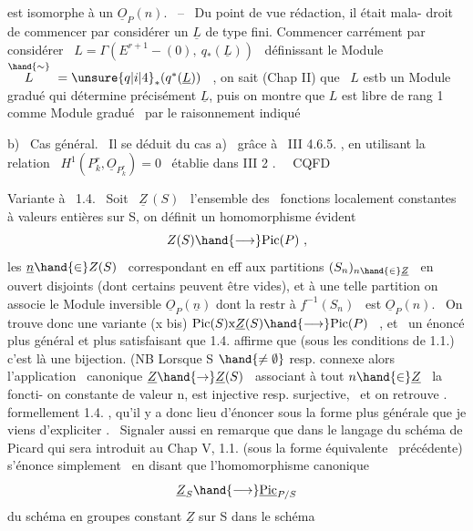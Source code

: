 
\placedmargin{\ensuremath{/}}est isomorphe à un $\underline{O}_P(n)$. \ -- \ Du point de vue rédaction, il était mala-%
droit de commencer par considérer un $\underline{L}$ de type fini. Commencer carrément
par considérer \ $L = \Gamma(E^{r+1}-(0),\ q_*(\underline{L}))$ \ définissant le Module
$\overset{\hand{\sim}}{L} \ = \unsure{q|i|4}_*(q^*(\underline{L}))$ \ , on sait (Chap II) que \ $L$ estb un Module gradué qui
détermine précisément $\underline{L}$, puis on montre que $L$ est libre de rang 1 comme Module
gradué \ par le raisonnement indiqué\placedmargin{\ensuremath{\swarrow}}\unsure{\hand{:}|:}

b) \ Cas général. \ Il se déduit du cas a) \ grâce à \ III 4.6.5. , en
utilisant la relation \ $H^1(P^r_k,\underline{O}_{P^r_k}) = 0$ \ établie dans III 2 . \ \ CQFD\placedmargin{\ensuremath{/}}

Variante à \ 1.4. \ Soit \ $\underline{Z}\,(S)$ \ l'ensemble des \ fonctions localement
constantes à valeurs entières sur S, on définit un homomorphisme évident
\[ Z(S) \hand{\longrightarrow} \mathrm{Pic}(P) \ , \]
les  $\underline{n} \hand{\in} Z(S)$ \ correspondant en eff aux  partitions $(S_n)_{n\hand{\in}\underline{Z}}$ \ en ouvert
disjoints (dont certains peuvent être vides),  et  à une
telle partition on associe le Module inversible $\underline{O}_P(\underline{n})$ dont la restr à 
$f^{-1}(S_n)$ \ est $\underline{O}_P(n)$. \ On trouve donc une variante
(x bis) \hfill $\mathrm{Pic}(S)\mathrm{x}\underline{Z}(S) \hand{\longrightarrow} \mathrm{Pic}(P)$ \ , \hfill
et \ un énoncé plus général et plus satisfaisant que 1.4. affirme que
(sous les conditions de 1.1.) c'est là une bijection. (NB Lorsque S $\hand{\neq \emptyset}$
resp. connexe
alors l'application \ canonique $\underline{Z} \hand{\to} \underline{Z}(S)$ \ associant à tout $n \hand{\in} \underline{Z}$ \ la foncti-%
on constante de valeur n, est injective resp. surjective, \ et on retrouve .
formellement 1.4. , qu'il y a donc lieu d'énoncer sous la forme plus
générale que je viens d'expliciter . \ Signaler aussi en remarque que
dans le langage du schéma de Picard qui sera introduit au Chap V, 1.1.
(sous la forme équivalente \ précédente) s'énonce simplement \ en disant que
l'homomorphisme canonique
\[ \underline{Z}_S \hand{\longrightarrow} \underline{\mathrm{Pic}}_{P/S} \]
du schéma en groupes constant  $\underline{Z}$ sur S dans le schéma\placedmargin{\ensuremath{\backslash}}

